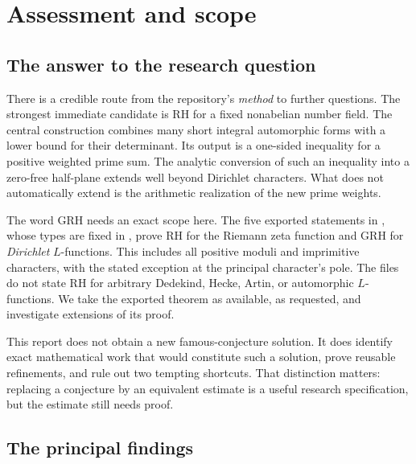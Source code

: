 \documentclass[11pt,letterpaper]{article}
\theoremstyle{definition}
\theoremstyle{remark}
\begin{document}
\tableofcontents
\newpage

\section{Assessment and scope}

\subsection{The answer to the research question}

There is a credible route from the repository's \emph{method} to further
questions. The strongest immediate candidate is RH for a fixed nonabelian
number field. The central construction combines many short integral
automorphic forms with a lower bound for their determinant. Its output is
a one-sided inequality for a positive weighted prime sum. The analytic
conversion of such an inequality into a zero-free half-plane extends
well beyond Dirichlet characters. What does not automatically extend is
the arithmetic realization of the new prime weights.

The word GRH needs an exact scope here. The five exported statements in
, whose types are fixed in
, prove RH for the Riemann zeta function and
GRH for \emph{Dirichlet} $L$-functions. This includes all positive moduli
and imprimitive characters, with the stated exception at the principal
character's pole. The files do not state RH for arbitrary Dedekind,
Hecke, Artin, or automorphic $L$-functions. We take the exported theorem
as available, as requested, and investigate extensions of its proof.
\cite{grh-main,grh-statements}

This report does not obtain a new famous-conjecture solution. It does
identify exact mathematical work that would constitute such a solution,
prove reusable refinements, and rule out two tempting shortcuts. That
distinction matters: replacing a conjecture by an equivalent estimate is
a useful research specification, but the estimate still needs proof.

\subsection{The principal findings}
\end{document}
